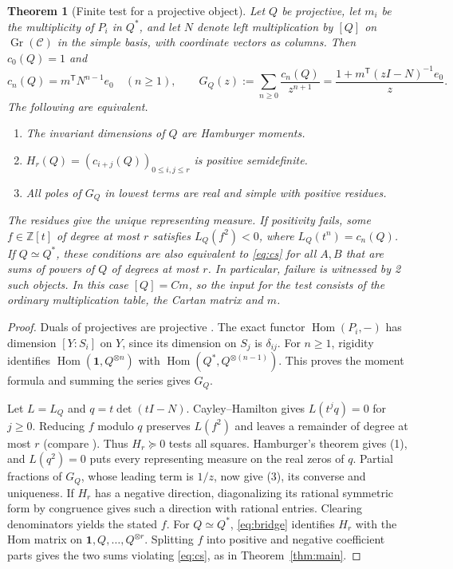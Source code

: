 \documentclass[11pt,reqno]{amsart}
\newtheorem{theorem}{Theorem}[section]
\theoremstyle{definition}
\newcommand{\Hom}{\operatorname{Hom}}
\newcommand{\one}{\mathbf 1}
\newcommand{\C}{\mathcal C}
\DeclareMathOperator{\Gr}{Gr}
\begin{document}
\begin{theorem}[Finite test for a projective object]\label{thm:finite-test}
Let $Q$ be projective, let $m_i$ be the multiplicity of $P_i$ in $Q^*$,
and let $N$ denote left multiplication by $[Q]$ on $\Gr(\C)$ in the
simple basis, with coordinate vectors as columns. Then $c_0(Q)=1$ and
\[
 c_n(Q)=m^{\mathsf T} N^{n-1}e_0\quad(n\ge1),\qquad
 G_Q(z):=\sum_{n\ge0}\frac{c_n(Q)}{z^{n+1}}
   =\frac{1+m^{\mathsf T}(zI-N)^{-1}e_0}{z}.
\]
The following are equivalent.
\begin{enumerate}
\item The invariant dimensions of $Q$ are Hamburger moments.
\item $H_r(Q)=(c_{i+j}(Q))_{0\le i,j\le r}$ is positive semidefinite.
\item All poles of $G_Q$ in lowest terms are real and simple with positive residues.
\end{enumerate}
The residues give the unique representing measure. If positivity fails, some $f\in\mathbb Z[t]$ of degree at most $r$ satisfies $L_Q(f^2)<0$, where $L_Q(t^n)=c_n(Q)$. If $Q\simeq Q^*$,
these conditions are also equivalent to \eqref{eq:cs} for all $A,B$
that are sums of powers of $Q$ of degrees at most $r$. In particular,
failure is witnessed by 2 such objects. In this case $[Q]=Cm$, so
the input for the test consists of the ordinary multiplication table,
the Cartan matrix and $m$.
\end{theorem}
\begin{proof}
Duals of projectives are projective \cite[Proposition~6.1.3]{EGNO}.
The exact functor $\Hom(P_i,-)$ has dimension $[Y:S_i]$ on $Y$, since
its dimension on $S_j$ is $\delta_{ij}$. For $n\ge1$, rigidity identifies
$\Hom(\one,Q^{\otimes n})$ with $\Hom(Q^*,Q^{\otimes(n-1)})$.
This proves the moment formula and summing the series gives $G_Q$.

Let $L=L_Q$ and $q=t\det(tI-N)$. Cayley--Hamilton gives $L(t^j q)=0$ for $j\ge0$. Reducing $f$ modulo $q$ preserves $L(f^2)$ and leaves a remainder of degree at most $r$ (compare \cite[\S3]{CF}). Thus $H_r\succeq0$ tests all squares. Hamburger's theorem gives (1), and $L(q^2)=0$ puts every representing measure on the real zeros of $q$. Partial fractions of $G_Q$, whose leading term is $1/z$, now give (3), its converse and uniqueness. If $H_r$ has a negative direction, diagonalizing its rational symmetric form by congruence gives such a direction with rational entries. Clearing denominators yields the stated $f$. For $Q\simeq Q^*$, \eqref{eq:bridge} identifies $H_r$ with the Hom matrix on $\one,Q,\ldots,Q^{\otimes r}$. Splitting $f$ into positive and negative coefficient parts gives the two sums violating \eqref{eq:cs}, as in Theorem~\ref{thm:main}.
\end{proof}
\end{document}

